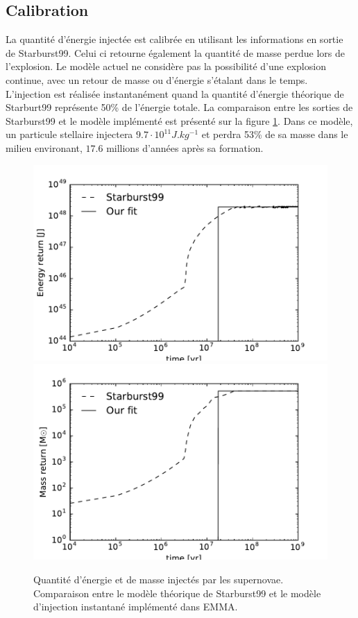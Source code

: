 \subsection{Calibration}
La quantité d'énergie injectée est calibrée en utilisant les informations en sortie de Starburst99.
Celui ci retourne également la quantité de masse perdue lors de l'explosion.
Le modèle actuel ne considère pas la possibilité d'une explosion continue, avec un retour de masse ou d'énergie s'étalant dans le temps.
L'injection est réalisée instantanément quand la quantité d’énergie théorique de Starburt99 représente 50\% de l’énergie totale.
La comparaison entre les sorties de Starburst99 et le modèle implémenté est présenté sur la figure \ref{fig:SNloss}.
Dans ce modèle, un particule stellaire injectera $9.7\cdot 10^{11} J.kg^{-1}$ et perdra 53\% de sa masse dans le milieu environant, $17.6$ millions d'années après sa formation.

\begin{figure}
        \includegraphics[width=.95\textwidth]{img/03/energy_loss.pdf} 
		\includegraphics[width=.95\textwidth]{img/03/mass_loss.pdf} 
        \caption[Calibration des supernovæ]{ Quantité d'énergie et de masse injectés par les supernovae. Comparaison entre le modèle théorique de Starburst99 et le modèle d'injection instantané implémenté dans EMMA.
 		\label{fig:SNloss}}
\end{figure}


